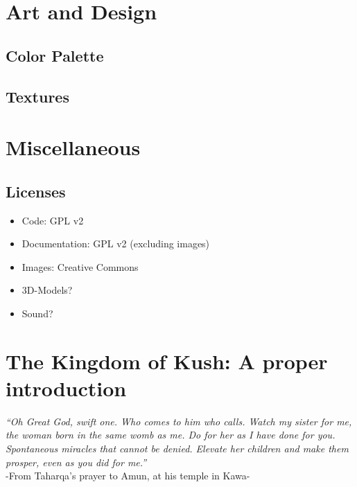 \documentclass[a4paper,12pt]{scrreprt}
\begin{document}
\chapter{Art and Design}

\section{Color Palette}

\section{Textures}

\chapter{Miscellaneous}

\section{Licenses}

\begin{itemize}
	\item Code: GPL v2
	\item Documentation: GPL v2 (excluding images)
	\item Images: Creative Commons
	\item 3D-Models?
	\item Sound?
\end{itemize}

\chapter{The Kingdom of Kush: A proper introduction}

\begin{center}
\textit{“Oh Great God, swift one. Who comes to him who calls. Watch my sister for me, the woman born in the same womb as me. Do for her as I have done for you. Spontaneous miracles that cannot be denied. Elevate her children and make them prosper, even as you did for me.”}\\[12pt]

\noindent
-From Taharqa’s prayer to Amun, at his temple in Kawa-
\end{center}
\end{document}
